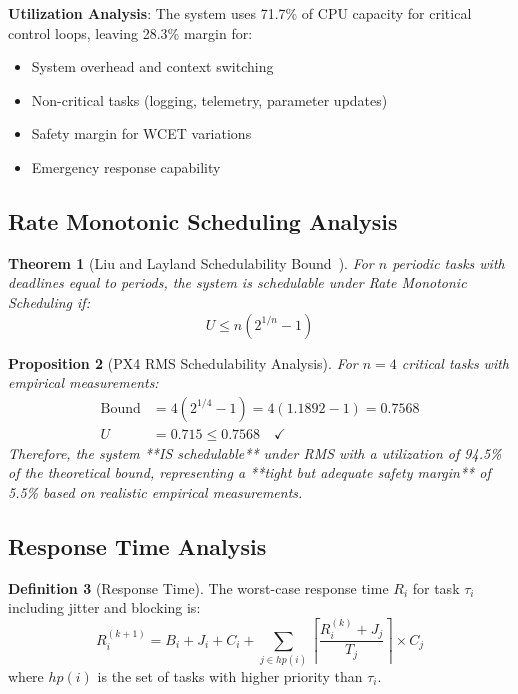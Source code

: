 \documentclass[11pt,a4paper]{article}
\newtheorem{theorem}{Theorem}[section]
\newtheorem{proposition}[theorem]{Proposition}
\theoremstyle{definition}
\newtheorem{definition}[theorem]{Definition}
\theoremstyle{remark}
\begin{document}
\textbf{Utilization Analysis}: The system uses 71.7\% of CPU capacity for critical control loops, leaving 28.3\% margin for:
\begin{itemize}
\item System overhead and context switching
\item Non-critical tasks (logging, telemetry, parameter updates)
\item Safety margin for WCET variations
\item Emergency response capability
\end{itemize}

\subsection{Rate Monotonic Scheduling Analysis}

\begin{theorem}[Liu and Layland Schedulability Bound~\cite{liu1973}]
For $n$ periodic tasks with deadlines equal to periods, the system is schedulable under Rate Monotonic Scheduling if:
\begin{equation}
U \leq n(2^{1/n} - 1)
\end{equation}
\end{theorem}

\begin{proposition}[PX4 RMS Schedulability Analysis]
For $n = 4$ critical tasks with empirical measurements:
\begin{align}
\text{Bound} &= 4(2^{1/4} - 1) = 4(1.1892 - 1) = 0.7568 \\
U &= 0.715 \leq 0.7568 \quad \checkmark
\end{align}
Therefore, the system **IS schedulable** under RMS with a utilization of 94.5\% of the theoretical bound, representing a **tight but adequate safety margin** of 5.5\% based on realistic empirical measurements.
\end{proposition}

\subsection{Response Time Analysis}

\begin{definition}[Response Time]
The worst-case response time $R_i$ for task $\tau_i$ including jitter and blocking is:
\begin{equation}
R_i^{(k+1)} = B_i + J_i + C_i + \sum_{j \in hp(i)} \left\lceil \frac{R_i^{(k)} + J_j}{T_j} \right\rceil \times C_j
\end{equation}
where $hp(i)$ is the set of tasks with higher priority than $\tau_i$.
\end{definition}
\end{document}
